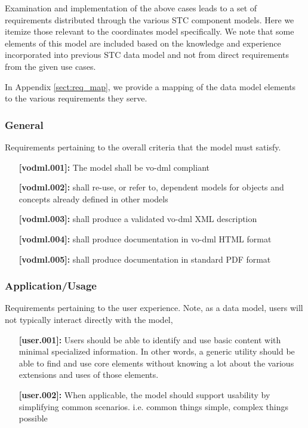 \documentclass[11pt,a4paper]{ivoa}
\begin{document}
 Examination and implementation of the above cases leads to a set of requirements distributed through the various STC component models.  Here we 
itemize those relevant to the coordinates model specifically.  We note that some elements of this model are included based on the knowledge and 
experience incorporated into previous STC data model and not from direct requirements from the given use cases.  

In Appendix \ref{sect:req_map}, we provide a mapping of the data model elements to the various requirements they serve.

\subsubsection{General}
Requirements pertaining to the overall criteria that the model must satisfy.
  \begin{itemize}
    \item [\textbf{[vodml.001]:}] The model shall be vo-dml compliant
    \item [\textbf{[vodml.002]:}] shall re-use, or refer to, dependent models for objects and concepts already defined in other models
    \item [\textbf{[vodml.003]:}] shall produce a validated vo-dml XML description
    \item [\textbf{[vodml.004]:}] shall produce documentation in vo-dml HTML format
    \item [\textbf{[vodml.005]:}] shall produce documentation in standard PDF format
  \end{itemize}

\subsubsection{Application/Usage}
Requirements pertaining to the user experience.  Note, as a data model, users will not typically interact directly with the model,
  \begin{itemize}
    \item [\textbf{[user.001]:}] Users should be able to identify and use basic content with minimal specialized information. 
      In other words, a generic utility should be able to find and use core elements without knowing a lot about the various extensions and uses of those elements.
    \item [\textbf{[user.002]:}] When applicable, the model should support usability by simplifying common scenarios. i.e. common things simple, complex things possible
  \end{itemize}
\end{document}
